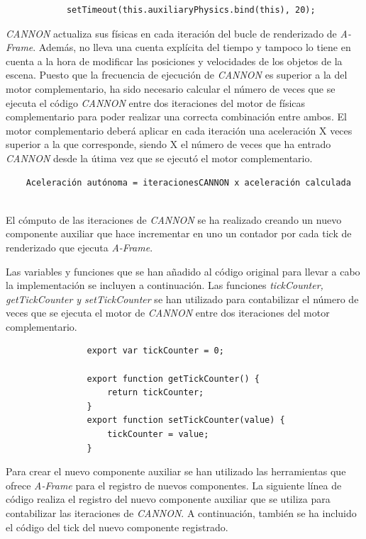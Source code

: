 \small {
\begin{verbatim}
            setTimeout(this.auxiliaryPhysics.bind(this), 20);
\end{verbatim}
}

\normalsize
\textit{CANNON} actualiza sus físicas en cada iteración del bucle de renderizado de \textit{A-Frame}. Además, no lleva una cuenta explícita del tiempo y tampoco lo tiene en cuenta a la hora de modificar las posiciones y velocidades de los objetos de la escena. Puesto que la frecuencia de ejecución de \textit{CANNON} es superior a la del motor complementario, ha sido necesario calcular el número de veces que se ejecuta el código \textit{CANNON} entre dos iteraciones del motor de físicas complementario para poder realizar una correcta combinación entre ambos. El motor complementario deberá aplicar en cada iteración una aceleración X veces superior a la que corresponde, siendo X el número de veces que ha entrado \textit{CANNON} desde la útima vez que se ejecutó el motor complementario. \newline

\small {
\begin{verbatim}
    Aceleración autónoma = iteracionesCANNON x aceleración calculada
    
\end{verbatim}
}

\normalsize
El cómputo de las iteraciones de \textit{CANNON} se ha realizado creando un nuevo componente auxiliar que hace incrementar en uno un contador por cada tick de renderizado que ejecuta \textit{A-Frame}. \newline


Las variables y funciones que se han añadido al código original para llevar a cabo la implementación se incluyen a continuación. Las funciones \textit{tickCounter, getTickCounter y setTickCounter} se han utilizado para contabilizar el número de veces que se ejecuta el motor de \textit{CANNON} entre dos iteraciones del motor complementario.

\small {
\begin{verbatim}
                export var tickCounter = 0;
                
                export function getTickCounter() {
                    return tickCounter;
                }
                export function setTickCounter(value) {
                    tickCounter = value;
                }
\end{verbatim}
}

\normalsize
Para crear el nuevo componente auxiliar se han utilizado las herramientas que ofrece \textit{A-Frame} para el registro de nuevos componentes. La siguiente línea de código realiza el registro del nuevo componente auxiliar que se utiliza para contabilizar las iteraciones de \textit{CANNON}. A continuación, también se ha incluido el código del tick del nuevo componente registrado.

